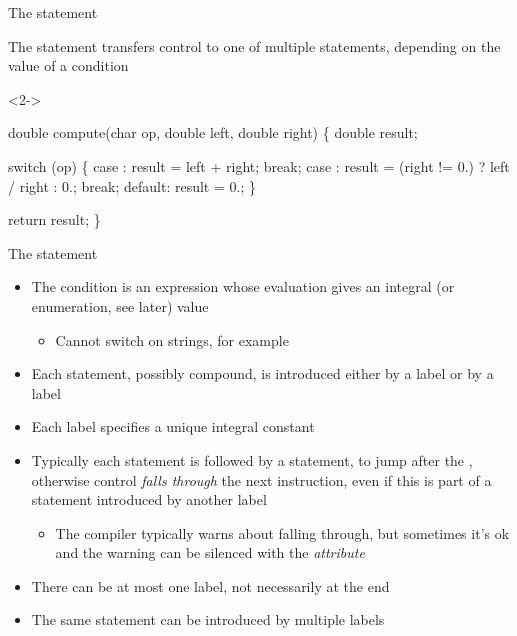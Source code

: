 \begin{frame}[fragile]{The  statement}

  The  statement transfers control to one of multiple statements,
  depending on the value of a condition

  \begin{codeblock}<2->{
double compute(char op, double left, double right)
\{
  double result;

  switch (op) \{
    case \upquote{+}:
      result = left + right;
      break;
    \ddd
    case \upquote{/}:
      result = (right != 0.) ? left / right : 0.;
      break;
    default:
      result = 0.;
  \}

  return result;
\}}\end{codeblock}

\end{frame}

\begin{frame}{The  statement \insertcontinuationtext}

  \begin{itemize}
  \item The condition is an expression whose evaluation gives an integral (or
    enumeration, see later) value
    \begin{itemize}
    \item Cannot switch on strings, for example
    \end{itemize}
  \item Each statement, possibly compound, is introduced either by a 
    label or by a  label
  \item Each  label specifies a unique integral constant
  \item Typically each statement is followed by a  statement, to
    jump after the , otherwise control \textit{falls through} the
    next instruction, even if this is part of a statement introduced by another
    label
    \begin{itemize}
    \item The compiler typically warns about falling through, but sometimes it's
      ok and the warning can be silenced with the \code{[[fallthrough]]}
      \textit{attribute}
    \end{itemize}
  \item There can be at most one  label, not necessarily at the
    end
  \item The same statement can be introduced by multiple  labels
  \end{itemize}

\end{frame}

